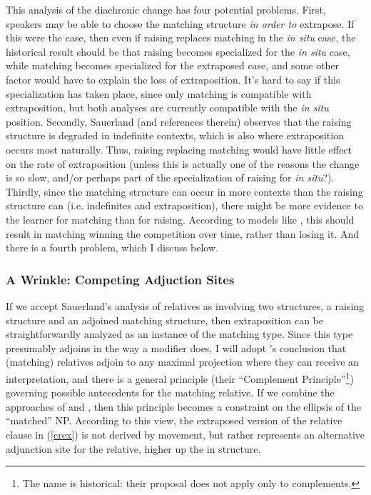 This analysis of the diachronic change has four potential problems. First, speakers may be able to choose the matching structure \textsl{in order to} extrapose. If this were the case, then even if raising replaces matching in the \textsl{in situ} case, the historical result should be that raising becomes specialized for the \textsl{in situ} case, while matching becomes specialized for the extraposed case, and some other factor would have to explain the loss of extraposition. It's hard to say if this specialization has taken place, since only matching is compatible with extraposition, but both analyses are currently compatible with the \textsl{in situ} position. Secondly, Sauerland (and references therein) observes that the raising structure is degraded in indefinite contexts, which is also where extraposition occurs most naturally. Thus, raising replacing matching would have little effect on the rate of extraposition (unless this is actually one of the reasons the change is so slow, and/or perhaps part of the specialization of raising for \textsl{in situ}?). Thirdly, since the matching structure can occur in more contexts than the raising structure can (i.e. indefinites and extraposition), there might be more evidence to the learner for matching than for raising. According to models like \citet{yang2000}, this should result in matching winning the competition over time, rather than losing it. And there is a fourth problem, which I discuss below.


\subsubsection{A Wrinkle: Competing Adjuction Sites}

If we accept Sauerland's analysis of relatives as involving two structures, a raising structure and an adjoined matching structure, then extraposition can be straightforwardly analyzed as an instance of the matching type. Since this type presumably adjoins in the way a modifier does, I will adopt \citet{culicoverrochemont1990}'s conclusion that (matching) relatives adjoin to any maximal projection where they can receive an interpretation, and there is a general principle (their ``Complement Principle''\footnote{The name is historical: their proposal does not apply only to complements.}) governing possible antecedents for the matching relative. If we combine the approaches of \citet{culicoverrochemont1990} and \citet{sauerland2003}, then this principle becomes a constraint on the ellipsis of the ``matched'' NP. According to this view, the extraposed version of the relative clause in (\ref{crex}) is not derived by movement, but rather represents an alternative adjunction site for the relative, higher up the in structure.

